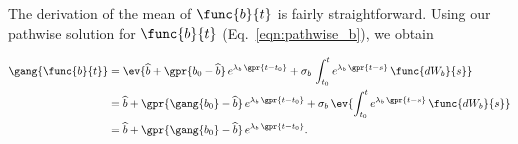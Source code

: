The derivation of the mean of $\func{b}{t}$ is fairly straightforward. Using our pathwise solution for $\func{b}{t}$ (Eq.~\ref{eqn:pathwise_b}), we obtain

\begin{align}
    \gang{\func{b}{t}} &= \ev{\widehat{b} + \gpr{b_0 - \widehat{b}}\,e^{\lambda_{b}\,\gpr{t - t_0}} + \sigma_{b}\,\int_{t_{0}}^{t} e^{\lambda_b\,\gpr{t - s}}\,\func{d{W}_{b}}{s}} \nonumber \\
		&= \widehat{b} + \gpr{\gang{b_0} - \widehat{b}}\,e^{\lambda_{b}\,\gpr{t - t_0}} + \sigma_{b}\,\ev{\int_{t_{0}}^{t} e^{\lambda_b\,\gpr{t - s}}\,\func{d{W}_{b}}{s}} \nonumber \\
		&= \widehat{b} + \gpr{\gang{b_0} - \widehat{b}}\,e^{\lambda_{b}\,\gpr{t - t_0}}. \label{eqn:mean_b}
\end{align}


